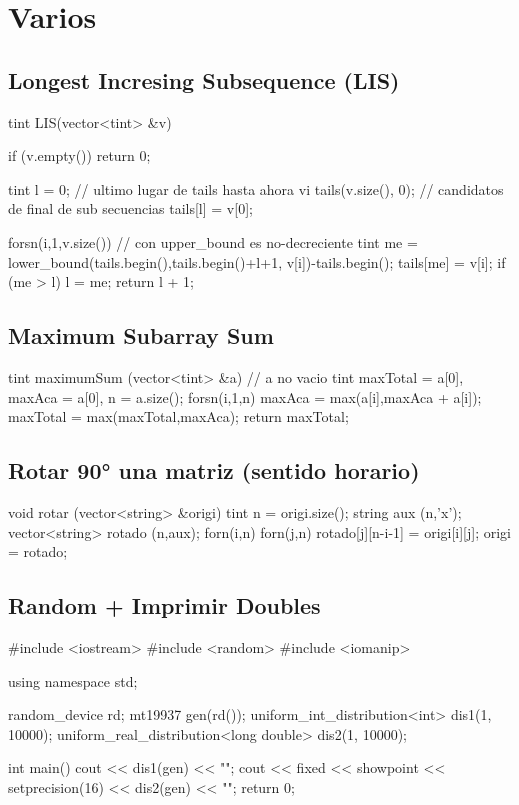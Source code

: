 \section{Varios}

\subsection{Longest Incresing Subsequence (LIS)}
\begin{code}
tint LIS(vector<tint> &v) {
  if (v.empty()) return 0;
  
  tint l = 0;             // ultimo lugar de tails hasta ahora
  vi tails(v.size(), 0);  // candidatos de final de sub secuencias
  tails[l] = v[0];
  
  forsn(i,1,v.size()) {
    // con upper_bound es no-decreciente
    tint me = lower_bound(tails.begin(),tails.begin()+l+1, v[i])-tails.begin();
    tails[me] = v[i];
    if (me > l) l = me;
  }
  return l + 1;
}
\end{code}

\subsection{Maximum Subarray Sum}
\begin{code}
tint maximumSum (vector<tint> &a) // a no vacio
{
	tint maxTotal = a[0], maxAca = a[0], n = a.size();
	forsn(i,1,n)
	{
		maxAca = max(a[i],maxAca + a[i]);
		maxTotal = max(maxTotal,maxAca);
	}
	return maxTotal;
}
\end{code}

\subsection{Rotar 90° una matriz (sentido horario)}
\begin{code}
void rotar (vector<string> &origi) 
{
	tint n = origi.size();
	string aux (n,'x');
	vector<string> rotado (n,aux);
	forn(i,n)
	forn(j,n)
		rotado[j][n-i-1] = origi[i][j];
	origi = rotado;
}
\end{code}

\subsection{Random + Imprimir Doubles}
\begin{code}
#include <iostream>
#include <random>
#include <iomanip>

using namespace std;

random_device rd;
mt19937 gen(rd());
uniform_int_distribution<int> dis1(1, 10000);
uniform_real_distribution<long double> dis2(1, 10000);

int main()
{
	cout <<  dis1(gen) << "\n";
	cout <<  fixed << showpoint << setprecision(16) << dis2(gen) << "\n";
	return 0;
}
\end{code}

